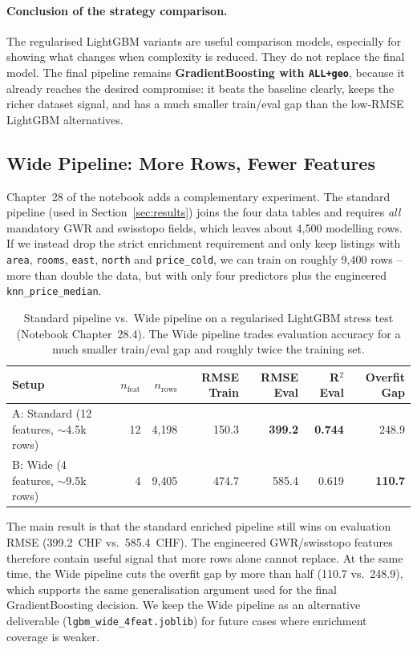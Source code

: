\documentclass[11pt,a4paper]{article}
\begin{document}
\paragraph{Conclusion of the strategy comparison.}
The regularised LightGBM variants are useful comparison models, especially for showing what changes when complexity is reduced. They do not replace the final model. The final pipeline remains \textbf{GradientBoosting with \texttt{ALL+geo}}, because it already reaches the desired compromise: it beats the baseline clearly, keeps the richer dataset signal, and has a much smaller train/eval gap than the low-RMSE LightGBM alternatives.

\subsection{Wide Pipeline: More Rows, Fewer Features}
\label{sec:wide}
Chapter~28 of the notebook adds a complementary experiment. The standard pipeline (used in Section~\ref{sec:results}) joins the four data tables and requires \emph{all} mandatory GWR and swisstopo fields, which leaves about 4{,}500 modelling rows. If we instead drop the strict enrichment requirement and only keep listings with \texttt{area}, \texttt{rooms}, \texttt{east}, \texttt{north} and \texttt{price\_cold}, we can train on roughly 9{,}400 rows -- more than double the data, but with only four predictors plus the engineered \texttt{knn\_price\_median}.

\begin{table}[h]
\centering
\small
\caption{Standard pipeline vs.\ Wide pipeline on a regularised LightGBM stress test (Notebook Chapter~28.4). The Wide pipeline trades evaluation accuracy for a much smaller train/eval gap and roughly twice the training set.}
\label{tab:wide-vs-standard}
\begin{tabular}{lrrrrrr}
\toprule
Setup & $n_{\text{feat}}$ & $n_{\text{rows}}$ & RMSE Train & RMSE Eval & R$^2$ Eval & Overfit Gap \\
\midrule
A: Standard (12 features, $\sim$4.5k rows) & 12 & 4{,}198 & 150.3 & \textbf{399.2} & \textbf{0.744} & 248.9 \\
B: Wide (4 features, $\sim$9.5k rows)      &  4 & 9{,}405 & 474.7 & 585.4 & 0.619 & \textbf{110.7} \\
\bottomrule
\end{tabular}
\end{table}

The main result is that the standard enriched pipeline still wins on evaluation RMSE (399.2~CHF vs.\ 585.4~CHF). The engineered GWR/swisstopo features therefore contain useful signal that more rows alone cannot replace. At the same time, the Wide pipeline cuts the overfit gap by more than half (110.7 vs.\ 248.9), which supports the same generalisation argument used for the final GradientBoosting decision. We keep the Wide pipeline as an alternative deliverable (\texttt{lgbm\_wide\_4feat.joblib}) for future cases where enrichment coverage is weaker.
\end{document}
